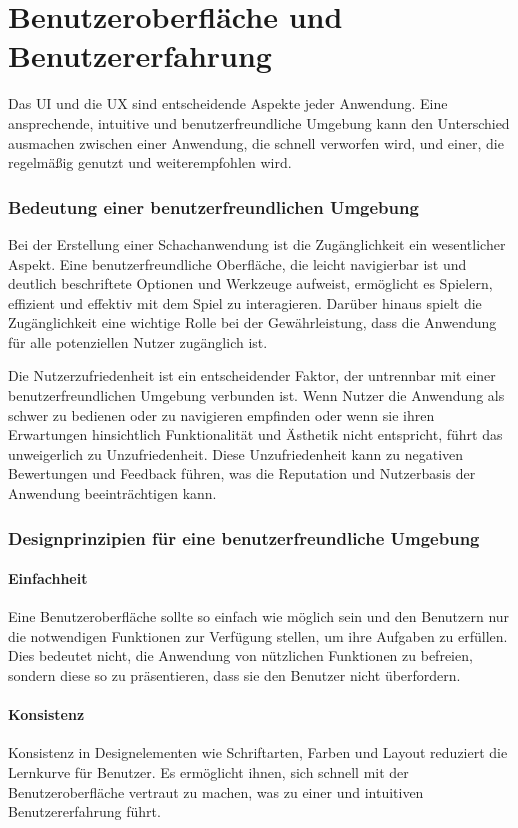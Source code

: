 \section{Benutzeroberfläche und Benutzererfahrung}
Das \ac{UI} und die \ac{UX} sind entscheidende Aspekte jeder Anwendung. Eine ansprechende, intuitive und benutzerfreundliche Umgebung 
kann den Unterschied ausmachen zwischen einer Anwendung, die schnell verworfen wird, und einer, die regelmäßig genutzt und weiterempfohlen wird.

\subsubsection{Bedeutung einer benutzerfreundlichen Umgebung}
Bei der Erstellung einer Schachanwendung ist die Zugänglichkeit ein wesentlicher Aspekt. Eine benutzerfreundliche Oberfläche, 
die leicht navigierbar ist und deutlich beschriftete Optionen und Werkzeuge aufweist, ermöglicht es Spielern, 
effizient und effektiv mit dem Spiel zu interagieren. Darüber hinaus spielt die Zugänglichkeit eine wichtige Rolle bei der Gewährleistung, 
dass die Anwendung für alle potenziellen Nutzer zugänglich ist.

Die Nutzerzufriedenheit ist ein entscheidender Faktor, der untrennbar mit einer benutzerfreundlichen Umgebung verbunden ist. 
Wenn Nutzer die Anwendung als schwer zu bedienen oder zu navigieren empfinden oder wenn sie ihren Erwartungen hinsichtlich 
Funktionalität und Ästhetik nicht entspricht, führt das unweigerlich zu Unzufriedenheit. 
Diese Unzufriedenheit kann zu negativen Bewertungen und Feedback führen, was die Reputation und 
Nutzerbasis der Anwendung beeinträchtigen kann.

\subsubsection{Designprinzipien für eine benutzerfreundliche Umgebung}
\paragraph{Einfachheit}
Eine Benutzeroberfläche sollte so einfach wie möglich sein und den Benutzern nur die notwendigen Funktionen zur Verfügung stellen, 
um ihre Aufgaben zu erfüllen. Dies bedeutet nicht, die Anwendung von nützlichen Funktionen zu befreien, sondern diese so zu präsentieren, 
dass sie den Benutzer nicht überfordern.

\paragraph{Konsistenz}
Konsistenz in Designelementen wie Schriftarten, Farben und Layout reduziert die Lernkurve für Benutzer. 
Es ermöglicht ihnen, sich schnell mit der Benutzeroberfläche vertraut zu machen, was zu einer und intuitiven Benutzererfahrung führt.
 
